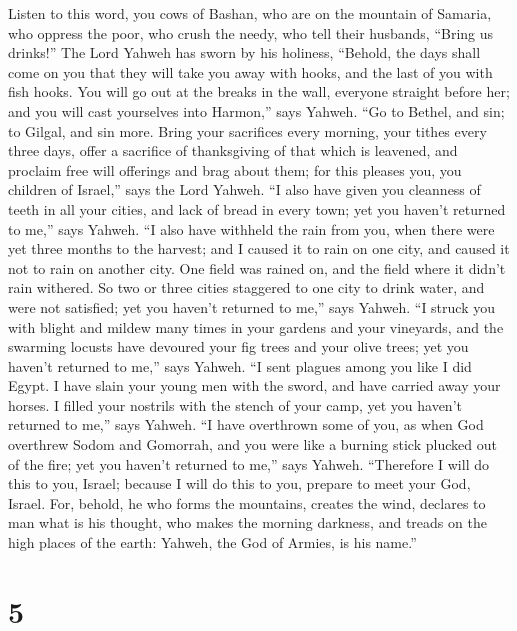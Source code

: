  Listen to this word, you cows of Bashan, who are on the
mountain of Samaria, who oppress the poor, who crush the needy, who tell
their husbands, ``Bring us drinks!''  The Lord Yahweh has
sworn by his holiness, ``Behold, the days shall come on you that they
will take you away with hooks, and the last of you with fish hooks.
 You will go out at the breaks in the wall, everyone
straight before her; and you will cast yourselves into Harmon,'' says
Yahweh.  ``Go to Bethel, and sin; to Gilgal, and sin more.
Bring your sacrifices every morning, your tithes every three days,
 offer a sacrifice of thanksgiving of that which is
leavened, and proclaim free will offerings and brag about them; for this
pleases you, you children of Israel,'' says the Lord Yahweh.
 ``I also have given you cleanness of teeth in all your
cities, and lack of bread in every town; yet you haven't returned to
me,'' says Yahweh.  ``I also have withheld the rain from
you, when there were yet three months to the harvest; and I caused it to
rain on one city, and caused it not to rain on another city. One field
was rained on, and the field where it didn't rain withered. 
So two or three cities staggered to one city to drink water, and were
not satisfied; yet you haven't returned to me,'' says Yahweh.
 ``I struck you with blight and mildew many times in your
gardens and your vineyards, and the swarming locusts have devoured your
fig trees and your olive trees; yet you haven't returned to me,'' says
Yahweh.  ``I sent plagues among you like I did Egypt. I
have slain your young men with the sword, and have carried away your
horses. I filled your nostrils with the stench of your camp, yet you
haven't returned to me,'' says Yahweh.  ``I have overthrown
some of you, as when God overthrew Sodom and Gomorrah, and you were like
a burning stick plucked out of the fire; yet you haven't returned to
me,'' says Yahweh.  ``Therefore I will do this to you,
Israel; because I will do this to you, prepare to meet your God, Israel.
 For, behold, he who forms the mountains, creates the wind,
declares to man what is his thought, who makes the morning darkness, and
treads on the high places of the earth: Yahweh, the God of Armies, is
his name.''

\hypertarget{section-4}{%
\section{5}\label{section-4}}

